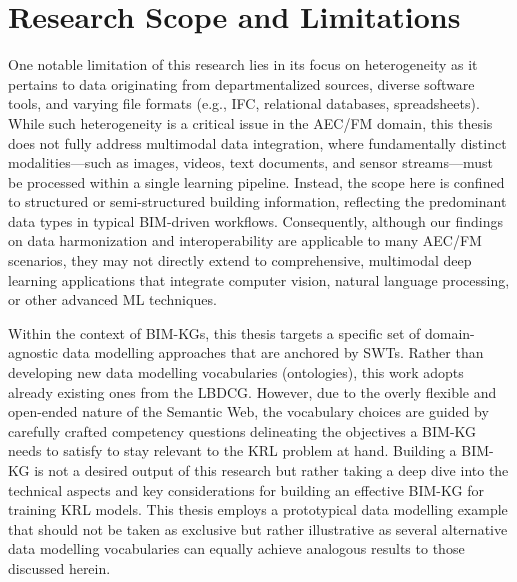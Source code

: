 \section{Research Scope and Limitations}
One notable limitation of this research lies in its focus on heterogeneity as it pertains to data originating from departmentalized sources, diverse software tools, and varying file formats (e.g., IFC, relational databases, spreadsheets). While such heterogeneity is a critical issue in the AEC/FM domain, this thesis does not fully address multimodal data integration, where fundamentally distinct modalities—such as images, videos, text documents, and sensor streams—must be processed within a single learning pipeline. Instead, the scope here is confined to structured or semi-structured building information, reflecting the predominant data types in typical BIM-driven workflows. Consequently, although our findings on data harmonization and interoperability are applicable to many AEC/FM scenarios, they may not directly extend to comprehensive, multimodal deep learning applications that integrate computer vision, natural language processing, or other advanced \ac{ML} techniques. 

Within the context of \acp{BIM-KG}, this thesis targets a specific set of domain-agnostic data modelling approaches that are anchored by \acp{SWT}. Rather than developing new data modelling vocabularies (ontologies), this work adopts already existing ones from the \ac{LBDCG}. However, due to the overly flexible and open-ended nature of the Semantic Web, the vocabulary choices are guided by carefully crafted competency questions delineating the objectives a \ac{BIM-KG} needs to satisfy to stay relevant to the \ac{KRL} problem at hand. Building a \ac{BIM-KG} is not a desired output of this research but rather taking a deep dive into the technical aspects and key considerations for building an effective \ac{BIM-KG} for training \ac{KRL} models. This thesis employs a prototypical data modelling example that should not be taken as exclusive but rather illustrative as several alternative data modelling vocabularies can equally achieve analogous results to those discussed herein. 

